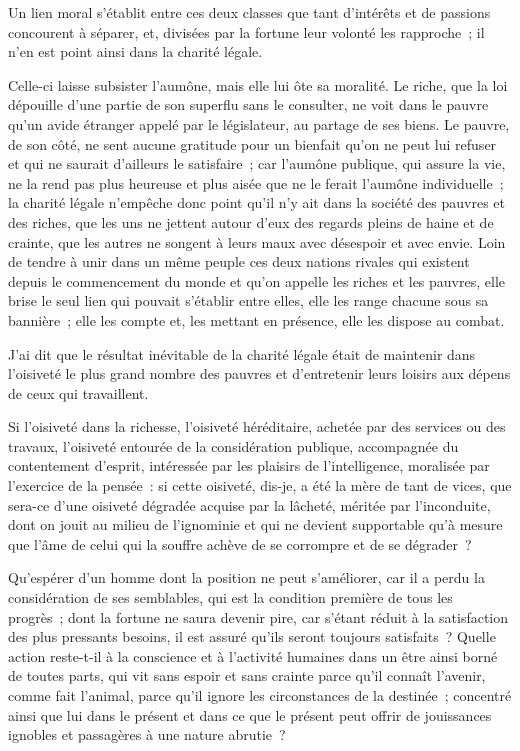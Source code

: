 \documentclass[french,twoside]{book} %
\begin{document}
\noindent Un lien moral s’établit entre ces deux classes que tant d’intérêts et de passions concourent à séparer, et, divisées par la fortune leur volonté les rapproche ; il n’en est point ainsi dans la charité légale.\par
Celle-ci laisse subsister l’aumône, mais elle lui ôte sa moralité. Le riche, que la loi dépouille d’une partie de son superflu sans le consulter, ne voit dans le pauvre qu’un avide étranger appelé par le législateur, au partage de ses biens. Le pauvre, de son côté, ne sent aucune gratitude pour un bienfait qu’on ne peut lui refuser et qui ne saurait d’ailleurs le satisfaire ; car l’aumône publique, qui assure la vie, ne la rend pas plus heureuse et plus aisée que ne le ferait l’aumône individuelle ; la charité légale n’empêche donc point qu’il n’y ait dans la société des pauvres et des riches, que les uns ne jettent autour d’eux des regards pleins de haine et de crainte, que les autres ne songent à leurs maux avec désespoir et avec envie. Loin de tendre à unir dans un même peuple ces deux nations rivales qui existent depuis le commencement du monde et qu’on appelle les riches et les pauvres, elle brise le seul lien qui pouvait s’établir entre elles, elle les range chacune sous sa bannière ; elle les compte et, les mettant en présence, elle les dispose au combat.\par
\bigbreak
\noindent J'ai dit que le résultat inévitable de la charité légale était de maintenir dans l’oisiveté le plus grand nombre des pauvres et d’entretenir leurs loisirs aux dépens de ceux qui travaillent.\par
Si l’oisiveté dans la richesse, l’oisiveté héréditaire, achetée par des services ou des travaux, l’oisiveté entourée de la considération publique, accompagnée du contentement d’esprit, intéressée par les plaisirs de l’intelligence, moralisée par l’exercice de la pensée : si cette oisiveté, dis-je, a été la mère de tant de vices, que sera-ce d’une oisiveté dégradée acquise par la lâcheté, méritée par l’inconduite, dont on jouit au milieu de l’ignominie et qui ne devient supportable qu’à mesure que l’âme de celui qui la souffre achève de se corrompre et de se dégrader ?\par
Qu'espérer d’un homme dont la position ne peut s’améliorer, car il a perdu la considération de ses semblables, qui est la condition première de tous les progrès ; dont la fortune ne saura devenir pire, car s’étant réduit à la satisfaction des plus pressants besoins, il est assuré qu’ils seront toujours satisfaits ? Quelle action reste-t-il à la conscience et à l’activité humaines dans un être ainsi borné de toutes parts, qui vit sans espoir et sans crainte parce qu’il connaît l’avenir, comme fait l’animal, parce qu’il ignore les circonstances de la destinée ; concentré ainsi que lui dans le présent et dans ce que le présent peut offrir de jouissances ignobles et passagères à une nature abrutie ?\par
\end{document}
